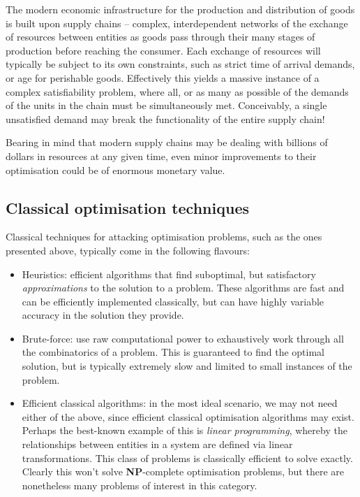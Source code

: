The modern economic infrastructure for the production and distribution of goods is built upon supply chains -- complex, interdependent networks of the exchange of resources between entities as goods pass through their many stages of production before reaching the consumer. Each exchange of resources will typically be subject to its own constraints, such as strict time of arrival demands, or age for perishable goods. Effectively this yields a massive instance of a complex satisfiability problem, where all, or as many as possible of the demands of the units in the chain must be simultaneously met. Conceivably, a single unsatisfied demand may break the functionality of the entire supply chain! 

Bearing in mind that modern supply chains may be dealing with billions of dollars in resources at any given time, even minor improvements to their optimisation could be of enormous monetary value.

\subsection{Classical optimisation techniques}

Classical techniques for attacking optimisation problems, such as the ones presented above, typically come in the following flavours:
\begin{itemize}
	\item Heuristics: efficient algorithms that find suboptimal, but satisfactory \textit{approximations} to the solution to a problem. These algorithms are fast and can be efficiently implemented classically, but can have highly variable accuracy in the solution they provide.
	\item Brute-force: use raw computational power to exhaustively work through all the combinatorics of a problem. This is guaranteed to find the optimal solution, but is typically extremely slow and limited to small instances of the problem.
	\item Efficient classical algorithms: in the most ideal scenario, we may not need either of the above, since efficient classical optimisation algorithms may exist. Perhaps the best-known example of this is \textit{linear programming}, whereby the relationships between entities in a system are defined via linear transformations. This class of problems is classically efficient to solve exactly. Clearly this won't solve \textbf{NP}-complete optimisation problems, but there are nonetheless many problems of interest in this category.
\end{itemize}

